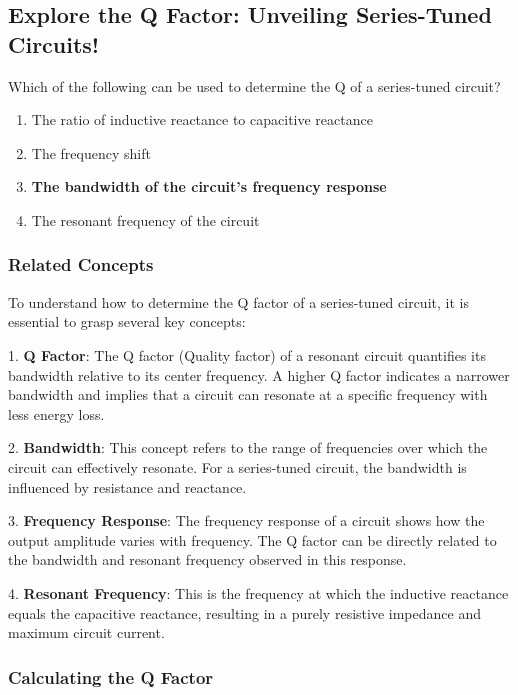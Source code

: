 \subsection{Explore the Q Factor: Unveiling Series-Tuned Circuits!}

\begin{tcolorbox}[colback=gray!10, colframe=black, title=E4B08] Which of the following can be used to determine the Q of a series-tuned circuit?
\begin{enumerate}[label=\Alph*.]
    \item The ratio of inductive reactance to capacitive reactance
    \item The frequency shift
    \item \textbf{The bandwidth of the circuit's frequency response}
    \item The resonant frequency of the circuit
\end{enumerate} \end{tcolorbox}

\subsubsection{Related Concepts}

To understand how to determine the Q factor of a series-tuned circuit, it is essential to grasp several key concepts:

1. \textbf{Q Factor}: The Q factor (Quality factor) of a resonant circuit quantifies its bandwidth relative to its center frequency. A higher Q factor indicates a narrower bandwidth and implies that a circuit can resonate at a specific frequency with less energy loss.

2. \textbf{Bandwidth}: This concept refers to the range of frequencies over which the circuit can effectively resonate. For a series-tuned circuit, the bandwidth is influenced by resistance and reactance.

3. \textbf{Frequency Response}: The frequency response of a circuit shows how the output amplitude varies with frequency. The Q factor can be directly related to the bandwidth and resonant frequency observed in this response.

4. \textbf{Resonant Frequency}: This is the frequency at which the inductive reactance equals the capacitive reactance, resulting in a purely resistive impedance and maximum circuit current.

\subsubsection{Calculating the Q Factor}

